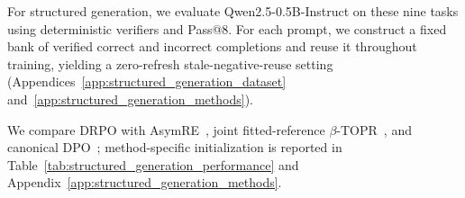 \documentclass{article}
\theoremstyle{plain}
\theoremstyle{definition}
\theoremstyle{remark}
\begin{document}
For structured generation, we evaluate Qwen2.5-0.5B-Instruct
\citep{qwen2024qwen25} on these nine tasks using deterministic verifiers
and Pass@8. For each prompt, we construct a fixed bank of verified correct
and incorrect completions and reuse it throughout training, yielding a
zero-refresh stale-negative-reuse setting
(Appendices~\ref{app:structured_generation_dataset}
and~\ref{app:structured_generation_methods}).

We compare DRPO with AsymRE~\citep{arnal2025asymmetric}, joint
fitted-reference \(\beta\)-TOPR~\citep{leroux2025tapered}, and canonical
DPO~\citep{rafailov2023direct}; method-specific initialization is reported
in Table~\ref{tab:structured_generation_performance} and
Appendix~\ref{app:structured_generation_methods}.

\begin{table}[t]
\centering
\caption{Normalized returns on the D4RL-9 Gym locomotion benchmark in (a)
and Pass@8 on structured-generation tasks in (b).}
\label{tab:external_task_performance}
\label{tab:d4rl_performance}
\label{tab:structured_generation_performance}
\vspace{-2pt}


\end{table}
\end{document}
